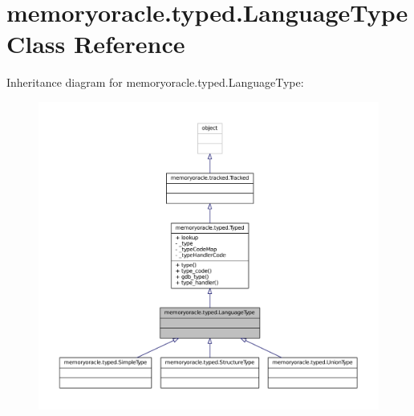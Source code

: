 \hypertarget{classmemoryoracle_1_1typed_1_1LanguageType}{}\section{memoryoracle.\+typed.\+Language\+Type Class Reference}
\label{classmemoryoracle_1_1typed_1_1LanguageType}


Inheritance diagram for memoryoracle.\+typed.\+Language\+Type\+:\nopagebreak
\begin{figure}[H]
\begin{center}
\leavevmode
\includegraphics[width=350pt]{classmemoryoracle_1_1typed_1_1LanguageType__inherit__graph}
\end{center}
\end{figure}



